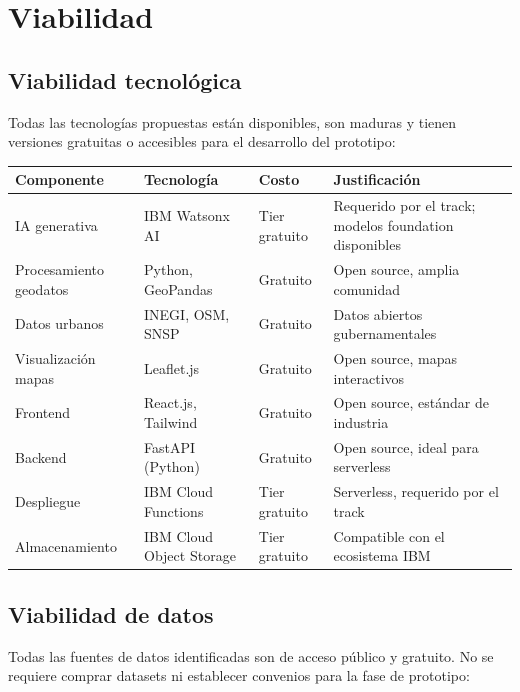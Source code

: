 \documentclass[12pt,a4paper]{article}
\begin{document}
\section{Viabilidad}

\subsection{Viabilidad tecnológica}

Todas las tecnologías propuestas están disponibles, son maduras y tienen versiones gratuitas o accesibles para el desarrollo del prototipo:

\begin{table}[H]
\centering
\small
\begin{tabularx}{\textwidth}{l l l X}
\toprule
\textbf{Componente} & \textbf{Tecnología} & \textbf{Costo} & \textbf{Justificación} \\
\midrule
IA generativa & IBM Watsonx AI & Tier gratuito & Requerido por el track; modelos foundation disponibles \\
Procesamiento geodatos & Python, GeoPandas & Gratuito & Open source, amplia comunidad \\
Datos urbanos & INEGI, OSM, SNSP & Gratuito & Datos abiertos gubernamentales \\
Visualización mapas & Leaflet.js & Gratuito & Open source, mapas interactivos \\
Frontend & React.js, Tailwind & Gratuito & Open source, estándar de industria \\
Backend & FastAPI (Python) & Gratuito & Open source, ideal para serverless \\
Despliegue & IBM Cloud Functions & Tier gratuito & Serverless, requerido por el track \\
Almacenamiento & IBM Cloud Object Storage & Tier gratuito & Compatible con el ecosistema IBM \\
\bottomrule
\end{tabularx}
\end{table}

\subsection{Viabilidad de datos}

Todas las fuentes de datos identificadas son de acceso público y gratuito. No se requiere comprar datasets ni establecer convenios para la fase de prototipo:
\end{document}
